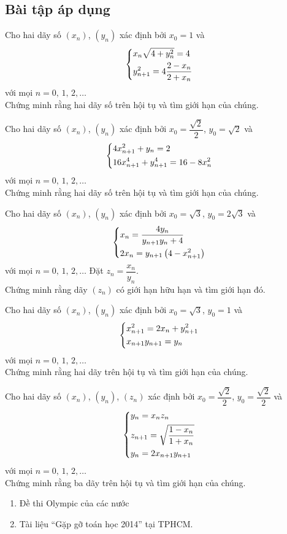 \subsection{Bài tập áp dụng}

\begin{bt}%
	Cho hai dãy số $\left(x_n\right)$, $\left(y_n\right)$ xác định bởi $x_0=1$ và $$\left\{\begin{aligned}& x_n\sqrt{4+y^2_n}=4 \\ & y^2_{n+1}=4\dfrac{2-x_n}{2+x_n}\end{aligned}\right.$$
	với mọi $n=0,\, 1,\, 2,\ldots$\\
	Chứng minh rằng hai dãy số trên hội tụ và tìm giới hạn của chúng.
\end{bt}
\begin{bt}%
Cho hai dãy số $\left(x_n\right)$, $\left(y_n\right)$ xác định bởi $x_0=\dfrac{\sqrt{2}}{2}$, $y_0=\sqrt{2}$ và $$\left\{\begin{aligned}& 4x^2_{n+1}+y_n=2\\ & 16x^4_{n+1}+y^4_{n+1}=16-8x^2_n\end{aligned}\right.$$
với mọi $n=0,\, 1,\, 2,\ldots$\\
Chứng minh rằng hai dãy số trên hội tụ và tìm giới hạn của chúng.
\end{bt}
\begin{bt}%
Cho hai dãy số $\left(x_n\right)$, $\left(y_n\right)$ xác định bởi $x_0=\sqrt{3}$, $y_0=2\sqrt{3}$ và $$\left\{\begin{aligned}& x_n=\dfrac{4y_n}{y_{n+1}y_n+4} \\ & 2x_n=y_{n+1}\left(4-x^2_{n+1}\right)\end{aligned}\right.$$
với mọi $n=0,\, 1,\, 2,\ldots$ Đặt $z_n=\dfrac{x_n}{y_n}$.\\
Chứng minh rằng dãy $\left(z_n\right)$ có giới hạn hữu hạn và tìm giới hạn đó.
\end{bt}
\begin{bt}%
	Cho hai dãy số $\left(x_n\right)$, $\left(y_n\right)$ xác định bởi $x_0=\sqrt{3}$, $y_0=1$ và $$\left\{\begin{aligned}& x^2_{n+1}=2x_n+y^2_{n+1}\\ & x_{n+1}y_{n+1}=y_n\end{aligned}\right.$$
	với mọi $n=0,\, 1,\, 2,\ldots$\\
	Chứng minh rằng hai dãy trên hội tụ và tìm giới hạn của chúng.
\end{bt}
\begin{bt}%
	Cho hai dãy số $\left(x_n\right)$, $\left(y_n\right)$, $\left(z_n\right)$ xác định bởi $x_0=\dfrac{\sqrt{2}}{2}$, $y_0=\dfrac{\sqrt{2}}{2}$ và $$\left\{\begin{aligned}& y_n=x_nz_n\\ & z_{n+1}=\sqrt{\dfrac{1-x_n}{1+x_n}}\\&y_n=2x_{n+1}y_{n+1}\end{aligned}\right.$$
	với mọi $n=0,\, 1,\, 2,\ldots$\\
	Chứng minh rằng  ba dãy trên hội tụ và tìm giới hạn của chúng.
\end{bt}
\begin{enumerate}[1.]
	\item Đề thi Olympic của các nước
	\item Tài liệu ``Gặp gỡ toán học 2014'' tại TPHCM.
\end{enumerate}


